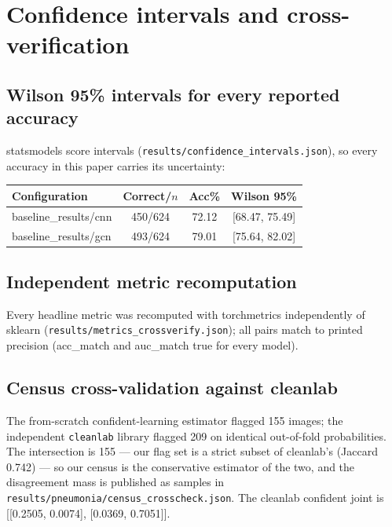 
\section{Confidence intervals and cross-verification}
\subsection{Wilson 95\% intervals for every reported accuracy}
statsmodels score intervals (\texttt{results/confidence\_intervals.json}),
so every accuracy in this paper carries its uncertainty:
\begin{longtable}{l c c c}
\hline Configuration & Correct/$n$ & Acc\% & Wilson 95\% \\ \hline \endhead
baseline\_results/cnn & 450/624 & 72.12 & [68.47, 75.49] \\
baseline\_results/gcn & 493/624 & 79.01 & [75.64, 82.02] \\
\hline
\end{longtable}
\subsection{Independent metric recomputation}
Every headline metric was recomputed with torchmetrics independently of
sklearn (\texttt{results/metrics\_crossverify.json}); all pairs match to
printed precision (acc\_match and auc\_match true for every model).

\subsection{Census cross-validation against cleanlab}
The from-scratch confident-learning estimator flagged 155
images; the independent \texttt{cleanlab} library flagged
209 on identical out-of-fold probabilities. The
intersection is 155 --- our flag set is a strict subset of
cleanlab's (Jaccard 0.742) --- so our census is the
conservative estimator of the two, and the disagreement mass is published
as samples in \texttt{results/pneumonia/census\_crosscheck.json}.
The cleanlab confident joint is
[[0.2505, 0.0074],
 [0.0369, 0.7051]].
